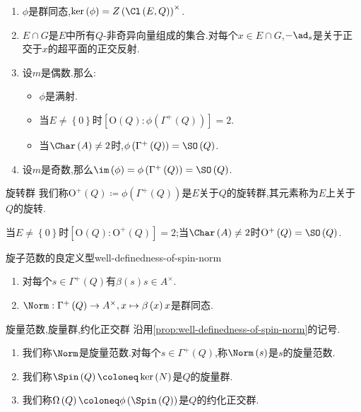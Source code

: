\begin{theorem}{}{}
	\begin{enumerate}
		\item $\phi$是群同态,$\ker\left(\phi\right)=Z\left(\Cl\left(E,Q\right)\right)^{\times}$.
		\item $E\cap G$是$E$中所有$Q$-非奇异向量组成的集合.对每个$x\in E\cap G$,$-\ad_{s}$是关于正交于$x$的超平面的正交反射.
		\item 设$m$是偶数.那么:
		\begin{itemize}
			\item $\phi$是满射.
			\item 当$E\neq\left\{0\right\}$时$\left[\mathrm{O}\left(Q\right):\phi\left(\Gamma^{+}\left(Q\right)\right)\right]=2$.
			\item 当$\Char\left(A\right)\neq 2$时,$\phi\left(\Gamma^{+}\left(Q\right)\right)=\SO\left(Q\right)$.
		\end{itemize}
		\item 设$m$是奇数,那么$\im\left(\phi\right)=\phi\left(\Gamma^{+}\left(Q\right)\right)=\SO\left(Q\right)$.
	\end{enumerate}
\end{theorem}

\begin{definition}{旋转群}{}
	我们称$\mathrm{O}^{+}\left(Q\right)\coloneq\phi\left(\Gamma^{+}\left(Q\right)\right)$是$E$关于$Q$的旋转群,其元素称为$E$上关于$Q$的旋转.
\end{definition}

\begin{remark}{}{}
	当$E\neq\left\{0\right\}$时$\left[\mathrm{O}\left(Q\right):\mathrm{O}^{+}\left(Q\right)\right]=2$;当$\Char\left(A\right)\neq 2$时$\mathrm{O}^{+}\left(Q\right)=\SO\left(Q\right)$.
\end{remark}

\begin{proposition}{旋子范数的良定义型}{well-definedness-of-spin-norm}
	\begin{enumerate}
		\item 对每个$s\in\Gamma^{+}\left(Q\right)$有$\beta\left(s\right)s\in A^{\times}$.
		\item $\Norm:\Gamma^{+}\left(Q\right)\to A^{\times},x\mapsto\beta\left(x\right)x$是群同态.
	\end{enumerate}
\end{proposition}

\begin{definition}{旋量范数,旋量群,约化正交群}{}
	沿用\cref{prop:well-definedness-of-spin-norm}的记号.
	\begin{enumerate}
		\item 我们称$\Norm$是旋量范数.对每个$s\in\Gamma^{+}\left(Q\right)$,称$\Norm\left(s\right)$是$s$的旋量范数.
		\item 我们称$\Spin\left(Q\right)\coloneq\ker\left(N\right)$是$Q$的旋量群.
		\item 我们称$\Omega\left(Q\right)\coloneq\phi\left(\Spin\left(Q\right)\right)$是$Q$的约化正交群.
	\end{enumerate}
\end{definition}

